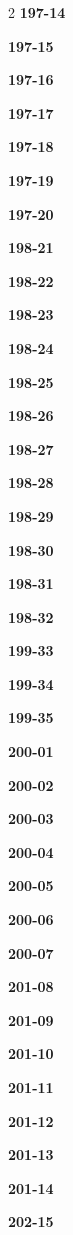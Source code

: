\documentclass[10pt,a4paper]{article}
\begin{document}
\begin{multicols}{2}
\noindent\textbf{197-14}\ \par
\noindent\textbf{197-15}\ \par
\noindent\textbf{197-16}\ \par
\noindent\textbf{197-17}\ \par
\noindent\textbf{197-18}\ \par
\noindent\textbf{197-19}\ \par
\noindent\textbf{197-20}\ \par
\noindent\textbf{198-21}\ \par
\noindent\textbf{198-22}\ \par
\noindent\textbf{198-23}\ \par
\noindent\textbf{198-24}\ \par
\noindent\textbf{198-25}\ \par
\noindent\textbf{198-26}\ \par
\noindent\textbf{198-27}\ \par
\noindent\textbf{198-28}\ \par
\noindent\textbf{198-29}\ \par
\noindent\textbf{198-30}\ \par
\noindent\textbf{198-31}\ \par
\noindent\textbf{198-32}\ \par
\noindent\textbf{199-33}\ \par
\noindent\textbf{199-34}\ \par
\noindent\textbf{199-35}\ \par
\noindent\textbf{200-01}\ \par
\noindent\textbf{200-02}\ \par
\noindent\textbf{200-03}\ \par
\noindent\textbf{200-04}\ \par
\noindent\textbf{200-05}\ \par
\noindent\textbf{200-06}\ \par
\noindent\textbf{200-07}\ \par
\noindent\textbf{201-08}\ \par
\noindent\textbf{201-09}\ \par
\noindent\textbf{201-10}\ \par
\noindent\textbf{201-11}\ \par
\noindent\textbf{201-12}\ \par
\noindent\textbf{201-13}\ \par
\noindent\textbf{201-14}\ \par
\noindent\textbf{202-15}\ \par

\end{multicols}
\end{document}

